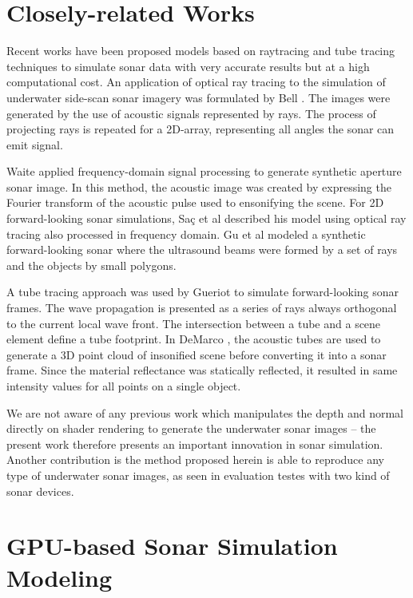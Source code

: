 \documentclass[final,5p,times]{elsarticle}
\begin{document}
\section{Closely-related Works}
\label{relatedworks}

Recent works have been proposed models based on raytracing and tube tracing techniques to simulate sonar data with very accurate results but at a high computational cost. An application of optical ray tracing to the simulation of underwater side-scan sonar imagery was formulated by Bell \cite{bell1997}. The images were generated by the use of acoustic signals represented by rays. The process of projecting rays is repeated for a 2D-array, representing all angles the sonar can emit signal.

Waite \cite{waite2002} applied frequency-domain signal processing to generate synthetic aperture sonar image. In this method, the acoustic image was created by expressing the Fourier transform of the acoustic pulse used to ensonifying the scene. For 2D forward-looking sonar simulations, Saç et al \cite{sac2015} described his model using optical ray tracing also processed in frequency domain. Gu et al \cite{gu2013} modeled a synthetic forward-looking sonar where the ultrasound beams were formed by a set of rays and the objects by small polygons.

A tube tracing approach was used by Gueriot \cite{gueriot2010} to simulate forward-looking sonar frames. The wave propagation is presented as a series of rays always orthogonal to the current local wave front. The intersection between a tube and a scene element define a tube footprint. In DeMarco \cite{demarco2015}, the acoustic tubes are used to generate a 3D point cloud of insonified scene before converting it into a sonar frame. Since the material reflectance was statically reflected, it resulted in same intensity values for all points on a single object.

We are not aware of any previous work which manipulates the depth and normal directly on shader rendering to generate the underwater sonar images -- the present work therefore presents an important innovation in sonar simulation. Another contribution is the method proposed herein is able to reproduce any type of underwater sonar images, as seen in evaluation testes with two kind of sonar devices.


\section{GPU-based Sonar Simulation Modeling}
\label{dev}
\end{document}
